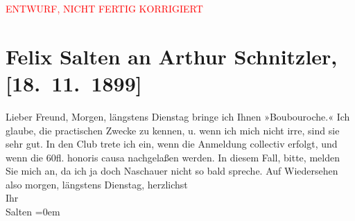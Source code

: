 
\begin{center}
            \textcolor{red}{ENTWURF, NICHT FERTIG KORRIGIERT}
                      \end{center}
            
         
         \renewcommand{\erwaehntePersonen}{Personen: Paul Naschauer}
         \renewcommand{\erwaehnteInstitutionen}{Institutionen: Wiener Schachclub}
         \renewcommand{\erwaehnteOrte}{Orte: Wien}
         \renewcommand{\erwaehnteWerke}{Werke: Boubouroche. Tragische Posse in zwei Akten}
               \section[Felix Salten an Arthur Schnitzler, {[}18. 11. 1899{]}]{ Felix Salten an Arthur Schnitzler, {[}18. 11. 1899{]}}\nopagebreak{}\rehead{ }\begin{ledgroupsized}[t]{13cm}\normalsize\beginnumbering \toendnotes[C]{\smallbreak\pagebreak[2]} 
\toendnotes[C]{\smallbreak}\pstart{}{\pb}Lieber Freund, \pend\pstart
           Morgen, längstens Dienstag bringe ich Ihnen »Boubouroche.« Ich glaube, die practischen Zwecke
               zu kennen, u. wenn ich mich nicht irre, sind sie sehr gut. In den Club trete ich ein, wenn die Anmeldung
               collectiv erfolgt, und wenn die 60fl. honoris causa nachgelaßen {\pb}werden. In diesem Fall, bitte,
               melden Sie mich an, da ich ja doch Naschauer
               nicht so bald spreche. Auf Wiedersehen also morgen, längstens Dienstag, \pend
           \pstart
           herzlichst {\\[\baselineskip]}Ihr {\\[\baselineskip]}\spacefill\mbox{Salten}\pend
           \leftskip=0em{}
         
         \endnumbering{}\end{ledgroupsized}\begin{anhang}\end{anhang}\newcommand{\dateiname}{L03302}\newcommand{\titel}{Felix Salten an Arthur Schnitzler, [18. 11. 1899]}\newcommand{\editorInnen}{Martin Anton Müller und Laura Untner}
      